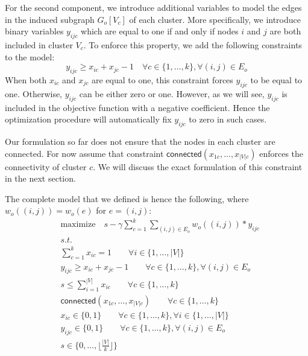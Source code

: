\documentclass[conference]{IEEEtran}
\begin{document}
For the second component, we introduce additional variables to model the edges in the induced subgraph $G_o[V_c]$ of each cluster. More specifically, we introduce binary variables $y_{ijc}$ which are equal to one if and only if
nodes $i$ and $j$ are both included in cluster $V_c$. To enforce
this property, we add the following constraints to the model:
\begin{equation}
y_{ijc} \geq x_{ic} + x_{jc} -1 \quad \forall c \in \{1, \ldots, k\}, \forall (i,j) \in E_o
\end{equation}
When both $x_{ic}$ and $x_{jc}$ are equal to one, this constraint forces
$y_{ijc}$ to be equal to one. Otherwise, $y_{ijc}$ can be either zero or
one. However, as we will see, $y_{ijc}$ is included in the objective
function with a negative coefficient. Hence the optimization procedure
will automatically fix $y_{ijc}$ to zero in such cases.

Our formulation so far does not ensure that the nodes in each cluster
are connected. For now assume that constraint
$\mathsf{connected}(x_{1c}, \ldots, x_{|V|c})$ enforces the connectivity of
cluster $c$. We will discuss the exact formulation of this constraint in
the next section. 

The complete model that we defined is hence the following, where $w_o((i,j)) = w_o(e)$ for $e=(i,j)$:
\begin{align}
& \text{maximize} \quad s - \gamma \sum_{c=1}^{k} \sum_{(i,j) \in E_o} w_o((i,j))* y_{ijc}  \\
&\textit{s.t.}                                                                       \nonumber \\
&\sum_{c=1}^k x_{ic} = 1                                                            \quad \quad \forall i \in \{1, \ldots, |V|\} \\
& y_{ijc} \geq x_{ic} + x_{jc} -1                                                    \quad \quad \forall c \in \{1, \ldots, k\}, \forall (i,j) \in E_o \\
& s \leq \sum_{i=1}^{|V|} x_{ic}                                                   \quad \quad \forall c \in \{1, \ldots, k\} \\
& \mathsf{connected}(x_{1c}, \ldots, x_{|V|c})                                       \quad \quad \forall c \in \{1, \ldots, k\} \\
& x_{ic} \in \{0, 1\}                                                                 \quad \quad \forall c \in \{1, \ldots, k\}, \forall i \in \{1, \ldots, |V|\} \\
& y_{ijc} \in \{0, 1\}                                                               \quad \quad  \forall c \in \{1, \ldots, k\}, \forall (i, j) \in E_o \\
& s \in \{0, \ldots, \lfloor \frac{|V|}{k} \rfloor \}                                  
\end{align}
\end{document}
